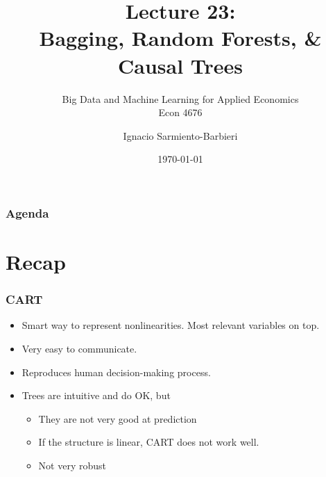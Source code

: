 \documentclass[
  shownotes,
  xcolor={svgnames},
  hyperref={colorlinks,citecolor=DarkBlue,linkcolor=DarkRed,urlcolor=DarkBlue}
  , aspectratio=169]{beamer}
\begin{document}
 
\title[Lecture 23]{Lecture 23: \\ Bagging, Random Forests, \& Causal Trees}
\subtitle{Big Data and Machine Learning for Applied Economics \\ Econ 4676}
\date{\today}

\author[Sarmiento-Barbieri]{Ignacio Sarmiento-Barbieri}


\begin{frame}[noframenumbering]
\maketitle
\end{frame}






\begin{frame}
\frametitle{Agenda}

\tableofcontents

\end{frame}
\section{Recap}
\begin{frame}[fragile]
\frametitle{CART}

\begin{itemize}
  \item Smart way to represent nonlinearities. Most relevant variables on top.
  \medskip
  \item Very easy to communicate.
  \medskip
  \item  Reproduces human decision-making process.
  \medskip
  \item Trees are intuitive and do OK, but
  \begin{itemize}
    \item They are not very good at prediction 
    \item If the structure is linear, CART does not work well.
    \item  Not very robust
  \end{itemize}
  
\end{itemize}


\end{frame}
\end{document}

